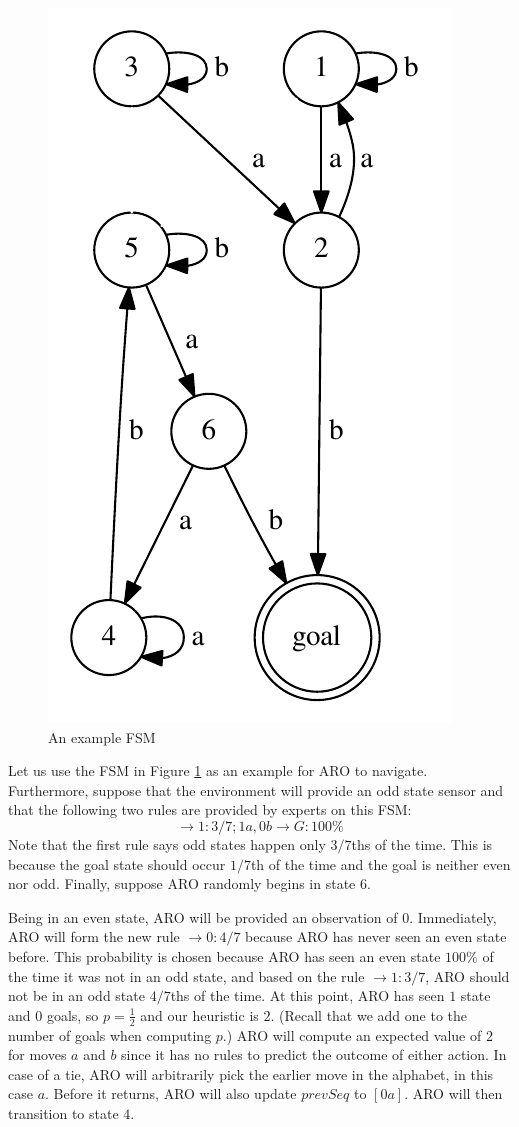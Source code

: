 \documentclass[letterpaper]{article} %
\begin{document}
\begin{figure}
	\centering
	\includegraphics[width=0.6\columnwidth]{ExampleFSM} %
	\caption{An example FSM}
	\label{fig1}
\end{figure}



Let us use the FSM in Figure \ref{fig1} as an example for ARO to navigate. Furthermore, suppose that the environment will provide an odd state sensor and that the following two rules are provided by experts on this FSM: $$ \rightarrow 1: 3/7; 1a, 0b \rightarrow G: 100\%$$
Note that the first rule says odd states happen only $3/7$ths of the time. This is because the goal state should occur $1/7$th of the time and the goal is neither even nor odd. Finally, suppose ARO randomly begins in state $6$.

Being in an even state, ARO will be provided an observation of $0$. Immediately, ARO will form the new rule $\rightarrow 0: 4/7$ because ARO has never seen an even state before. This probability is chosen because ARO has seen an even state $100\%$ of the time it was not in an odd state, and based on the rule $\rightarrow 1: 3/7$, ARO should not be in an odd state $4/7$ths of the time. At this point, ARO has seen $1$ state and $0$ goals, so $p = \frac{1}{2}$ and our heuristic is $2$. (Recall that we add one to the number of goals when computing $p$.) ARO will compute an expected value of $2$ for moves $a$ and $b$ since it has no rules to predict the outcome of either action. In case of a tie, ARO will arbitrarily pick the earlier move in the alphabet, in this case $a$. Before it returns, ARO will also update $prevSeq$ to $[0a]$. ARO will then transition to state $4$.
\end{document}

